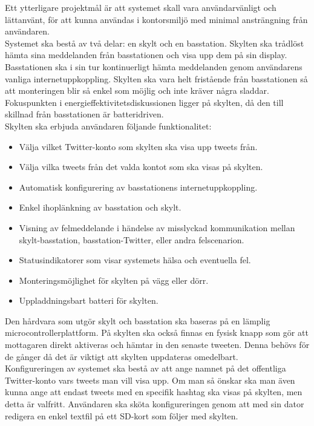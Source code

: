 \documentclass[a4paper,11pt]{article}
\begin{document}
Ett ytterligare projektmål är att systemet skall vara användarvänligt och lättanvänt, för att kunna användas i kontorsmiljö med minimal ansträngning från användaren. \\

Systemet ska bestå av två delar: en skylt och en basstation. Skylten ska trådlöst hämta sina meddelanden från basstationen och visa upp dem på sin display. Basstationen ska i sin tur kontinuerligt hämta meddelanden genom användarens vanliga internetuppkoppling. Skylten ska vara helt fristående från basstationen så att monteringen blir så enkel som möjlig och inte kräver några sladdar. Fokuspunkten i energieffektivitetsdiskussionen ligger på skylten, då den till skillnad från basstationen är batteridriven. \\

Skylten ska erbjuda användaren följande funktionalitet:
	\begin{itemize}
    	\item Välja vilket Twitter-konto som skylten ska visa upp tweets från.
    	\item Välja vilka tweets från det valda kontot som ska visas på skylten.
    	\item Automatisk konfigurering av basstationens internetuppkoppling.
    	\item Enkel ihoplänkning av basstation och skylt.
    	\item Visning av felmeddelande i händelse av misslyckad kommunikation mellan skylt-basstation, basstation-Twitter, eller andra felscenarion.
    	\item Statusindikatorer som visar systemets hälsa och eventuella fel.
    	\item Monteringsmöjlighet för skylten på vägg eller dörr.
    	\item Uppladdningsbart batteri för skylten.
    	\end{itemize}
    	
Den hårdvara som utgör skylt och basstation ska baseras på en lämplig microcontrollerplattform. På skylten ska också finnas en fysisk knapp som gör att mottagaren direkt aktiveras och hämtar in den senaste tweeten. Denna behövs för de gånger då det är viktigt att skylten uppdateras omedelbart. \\

Konfigureringen av systemet ska bestå av att ange namnet på det offentliga Twitter-konto vars tweets man vill visa upp. Om man så önskar ska man även kunna ange att endast tweets med en specifik hashtag ska visas på skylten, men detta är valfritt. Användaren ska sköta konfigureringen genom att med sin dator redigera en enkel textfil på ett SD-kort som följer med skylten.
\end{document}
